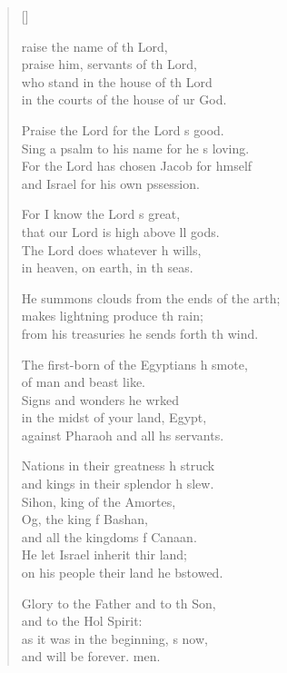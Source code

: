\settowidth{\versewidth}{He summons clouds from the ends of the earth; +}
\begin{verse}[\versewidth]
  \begin{patverse}
raise the name of th Lord,\Med\\
praise him, servants of th Lord,\\
who stand in the house of th Lord\Med\\
in the courts of the house of ur God.

Praise the Lord for the Lord \pointup{\i}s good.\Med\\
Sing a psalm to his name for he \pointup{\i}s loving.\\
For the Lord has chosen Jacob for h\pointup{\i}mself\Med\\
and Israel for his own pssession.

For I know the Lord \pointup{\i}s great,\Med\\
that our Lord is high above ll gods.\\
The Lord does whatever h wills,\Med\\
in heaven, on earth, in th seas.

He summons clouds from the ends of the arth;\Flex\\
makes lightning produce th rain;\Med\\
from his treasuries he sends forth th wind.

The first-born of the Egyptians h smote,\Med\\
of man and beast like.\\
Signs and wonders he wrked\Flex\\
in the midst of your land,  Egypt,\Med\\
against Pharaoh and all h\pointup{\i}s servants.

Nations in their greatness h struck\Med\\
and kings in their splendor h slew.\\
Sihon, king of the Amor\pointup{\i}tes,\Flex\\
Og, the king f Bashan,\Med\\
and all the kingdoms f Canaan.\\
He let Israel inherit thir land;\Med\\
on his people their land he bstowed.

Glory to the Father and to th Son,\Med\\
and to the Hol Spirit:\\
as it was in the beginning, \pointup{\i}s now,\Med\\
and will be forever. men.
  \end{patverse}
\end{verse}
